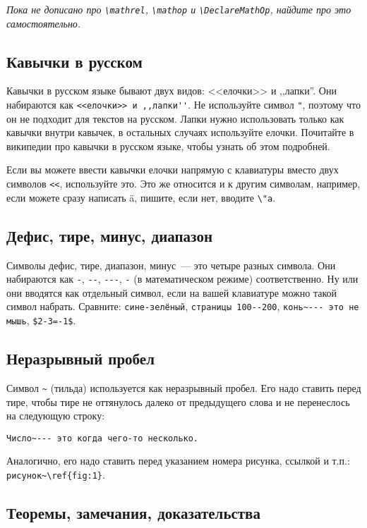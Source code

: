 \documentclass{article}
\begin{document}
    \em{Пока не дописано про  \verb|\mathrel|, \verb|\mathop| и \verb|\DeclareMathOp|, найдите
    про это самостоятельно}.

    \subsection{Кавычки в русском}

    Кавычки в русском языке бывают двух видов: <<елочки>> и ,,лапки''. Они набираются как
    \verb|<<елочки>> и ,,лапки''|. Не используйте символ \verb|"|, поэтому что он не подходит
    для текстов на русском. Лапки нужно использовать только как кавычки внутри кавычек, в остальных случаях
    используйте елочки. Почитайте в википедии про кавычки в русском языке, чтобы узнать об этом подробней.

    Если вы можете ввести кавычки елочки напрямую с клавиатуры вместо двух символов \verb|<<|, используйте это.
    Это же относится и к другим символам, например, если можете сразу написать ä, пишите, если нет, вводите \verb|\"a|.

    \subsection{Дефис, тире, минус, диапазон}

    Символы дефис, тире, диапазон, минус~--- это четыре разных символа. Они набираются как
    \verb|-|, \verb|--|, \verb|---|, \verb|-| (в математическом режиме) соответственно.
    Ну или они вводятся как отдельный символ, если на вашей клавиатуре можно такой символ
    набрать. Сравните: \verb|сине-зелёный|, \verb|страницы 100--200|,
    \verb|конь~--- это не мышь|, \verb|$2-3=-1$|.

    \subsection{Неразрывный пробел}

    Символ \verb|~| (тильда) используется как неразрывный пробел.
    Его надо ставить перед тире, чтобы тире не оттянулось далеко от предыдущего слова и не перенеслось на следующую строку:
    \begin{verbatim}Число~--- это когда чего-то несколько.
    \end{verbatim}
    Аналогично, его надо ставить перед указанием номера рисунка, ссылкой и т.п.: \verb|рисунок~\ref{fig:1}|.

    \subsection{Теоремы, замечания, доказательства}
\end{document}
